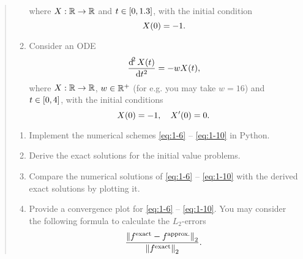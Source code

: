 \documentclass[english]{exercise}
\begin{document}
\begin{quote}
\begin{enumerate}[label=\arabic*.]
\begin{equation}
			\end{equation}
			where \(X: \R \to \R\) and \(t \in \brackets*{0, 1.3}\), with the initial condition
			\begin{equation}
				X\parentheses*{0} = -1.
			\end{equation}
			\item Consider an ODE
			\begin{equation}
				\frac{\d^2 X\parentheses*{t}}{\d t^2} = -wX\parentheses*{t},
			\end{equation}
			where \(X: \R \to \R\), \(w \in \R^+\) (for e.g. you may take \(w = 16\)) and \(t \in \brackets*{0, 4}\), with the initial conditions
			\begin{equation}
				X\parentheses*{0} = -1, \quad X'\parentheses*{0} = 0.
			\end{equation}
		\end{enumerate}
		\begin{enumerate}
			\item Implement the numerical schemes \eqref{eq:1-6} -- \eqref{eq:1-10} in Python.
			\item Derive the exact solutions for the initial value problems.
			\item Compare the numerical solutions of \eqref{eq:1-6} -- \eqref{eq:1-10} with the derived exact solutions by plotting it.
			\item Provide a convergence plot for \eqref{eq:1-6} -- \eqref{eq:1-10}.
			You may consider the following formula to calculate the \(L_2\)-errors
			\begin{equation}
				\frac{\norm*{f^{\text{exact}} - f^{\text{approx.}}}_2}{\norm*{f^{\text{exact}}}_2}.
			\end{equation}
		\end{enumerate}
	\end{quote}
\end{document}
